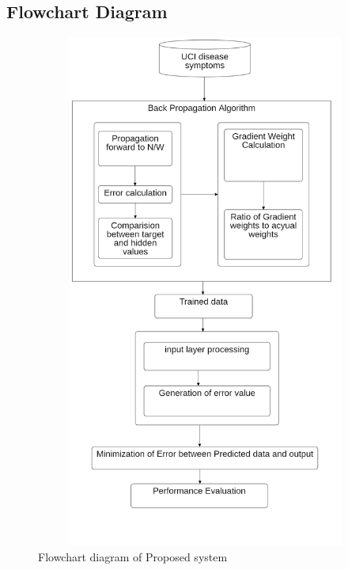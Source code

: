 \subsection{Flowchart Diagram}
\begin{figure}[H]
\begin{center}
    
\includegraphics[width=140mm,height=170mm]{images/flow.png}
 \caption{Flowchart diagram of Proposed system}
 \end{center}                
\end{figure}

